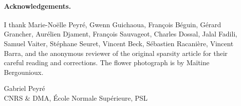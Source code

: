 \paragraph*{Acknowledgements.}
I thank Marie-Noëlle Peyré, Gwenn Guichaoua, François Béguin, Gérard Grancher, Aurélien Djament, François Sauvageot, Charles Dossal, Jalal Fadili, Samuel Vaiter, Stéphane Seuret, Vincent Beck, Sébastien Racanière, Vincent Barra, and the anonymous reviewer of the original sparsity article for their careful reading and corrections. The flower photograph is by Maïtine Bergounioux.

\medskip
\noindent Gabriel Peyré\\
CNRS \& DMA, École Normale Supérieure, PSL
